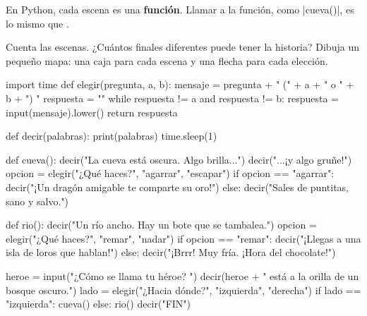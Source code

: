 En Python, cada escena es una \textbf{función}. Llamar a la función, como \py|cueva()|, es lo mismo que .

\begin{think}
Cuenta las escenas. ¿Cuántos finales diferentes puede tener la historia? Dibuja un pequeño mapa: una caja para cada escena y una flecha para cada elección.
\end{think}

\begin{typethis}
import time
def elegir(pregunta, a, b):
    mensaje = pregunta + " (" + a + " o " + b + ") "
    respuesta = ""
    while respuesta != a and respuesta != b:
        respuesta = input(mensaje).lower()
    return respuesta

def decir(palabras):
    print(palabras)
    time.sleep(1)

def cueva():
    decir("La cueva está oscura. Algo brilla...")
    decir("...¡y algo gruñe!")
    opcion = elegir("¿Qué haces?", "agarrar", "escapar")
    if opcion == "agarrar":
        decir("¡Un dragón amigable te comparte su oro!")
    else:
        decir("Sales de puntitas, sano y salvo.")

def rio():
    decir("Un río ancho. Hay un bote que se tambalea.")
    opcion = elegir("¿Qué haces?", "remar", "nadar")
    if opcion == "remar":
        decir("¡Llegas a una isla de loros que hablan!")
    else:
        decir("¡Brrr! Muy fría. ¡Hora del chocolate!")

heroe = input("¿Cómo se llama tu héroe? ")
decir(heroe + " está a la orilla de un bosque oscuro.")
lado = elegir("¿Hacia dónde?", "izquierda", "derecha")
if lado == "izquierda":
    cueva()
else:
    rio()
decir("FIN")
\end{typethis}

